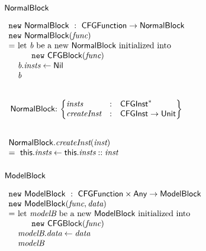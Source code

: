 \subsubsection{$\mbox{\textsf{NormalBlock}}$}
$
\begin{array}{l@{}l@{~}l}
\lefteqn{\new \ \NormalBlock \ : \ \CFGFunction \rightarrow \NormalBlock}\\
\lefteqn{\new\ \NormalBlock(\emph{func})}\\
& = & \text{let } \emph{b} \text{ be a new } \NormalBlock \text{ initialized into }\\
& & \quad\ \ \new\ \CFGBlock(\emph{func})\\
& & \emph{b}.\emph{insts} \leftarrow \Nil \\
& & \emph{b}\\
\end{array}
$

\noindent
$
\begin{array}{@{~}r@{~}l@{}l@{~}l}
\\
& \NormalBlock & : &
\begin{Bmatrix*}[l]
\emph{insts} & : & \CFGInst^{*} \\
\emph{createInst} & : & \CFGInst \rightarrow \Unit \\
\end{Bmatrix*}\\
\end{array}
$

\noindent
$
\begin{array}{l}
\\
\mbox{\textsf{NormalBlock}}.\emph{createInst}(\emph{inst})\\
= \ \mbox{\textsf{this}}.\emph{insts} \leftarrow \mbox{\textsf{this}}.\emph{insts} :: \emph{inst}\\
\end{array}
$

\subsubsection{$\mbox{\textsf{ModelBlock}}$}
$
\begin{array}{l@{}l@{~}l}
\lefteqn{\new \ \ModelBlock \ : \ \CFGFunction \times \Any \rightarrow \ModelBlock}\\
\lefteqn{\new\ \ModelBlock(\emph{func}, \emph{data})}\\
& = & \text{let } \emph{modelB} \text{ be a new } \ModelBlock \text{ initialized into }\\
& & \quad\ \ \new\ \CFGBlock(\emph{func})\\
& & \emph{modelB}.\emph{data} \leftarrow \emph{data} \\
& & \emph{modelB}\\
\end{array}
$

